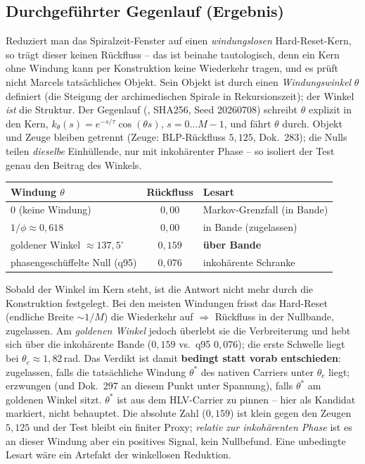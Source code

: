 \subsection*{Durchgeführter Gegenlauf (Ergebnis)}

Reduziert man das Spiralzeit-Fenster auf einen \emph{windungslosen}
Hard-Reset-Kern, so trägt dieser keinen Rückfluss -- das ist beinahe
tautologisch, denn ein Kern ohne Windung kann per Konstruktion keine
Wiederkehr tragen, und es prüft nicht Marcels tatsächliches Objekt. Sein Objekt ist durch einen \emph{Windungswinkel}
$\theta$ definiert (die Steigung der archimedischen Spirale in Rekursionszeit);
der Winkel \emph{ist} die Struktur. Der Gegenlauf
(,
SHA256, Seed 20260708) schreibt $\theta$ explizit in den Kern,
$k_\theta(s)=e^{-s/\tau}\cos(\theta s)$, $s=0\dots M{-}1$, und fährt $\theta$
durch. Objekt und Zeuge bleiben getrennt (Zeuge: BLP-Rückfluss $5{,}125$,
Dok.~283); die Nulls teilen \emph{dieselbe} Einhüllende, nur mit inkohärenter
Phase -- so isoliert der Test genau den Beitrag des Winkels.

\begin{center}\small
\begin{tabular}{lcl}
\hline
Windung $\theta$ & Rückfluss & Lesart\\
\hline
$0$ (keine Windung) & $0{,}00$ & Markov-Grenzfall (in Bande)\\
$1/\phi \approx 0{,}618$ & $0{,}00$ & in Bande (zugelassen)\\
goldener Winkel $\approx 137{,}5^\circ$ & $0{,}159$ & \textbf{über Bande}\\
phasengeschüffelte Null (q95) & $0{,}076$ & inkohärente Schranke\\
\hline
\end{tabular}
\end{center}

\noindent Sobald der Winkel im Kern steht, ist die Antwort nicht mehr durch
die Konstruktion festgelegt. Bei den meisten Windungen frisst das Hard-Reset
(endliche Breite $\sim 1/M$) die Wiederkehr auf $\Rightarrow$ Rückfluss in der
Nullbande, zugelassen. Am \emph{goldenen Winkel} jedoch überlebt sie die
Verbreiterung und hebt sich über die inkohärente Bande ($0{,}159$ vs.\ q95
$0{,}076$); die erste Schwelle liegt bei $\theta_c\approx 1{,}82$\,rad. Das
Verdikt ist damit \textbf{bedingt statt vorab entschieden}: zugelassen, falls
die tatsächliche Windung $\theta^\ast$ des nativen Carriers unter $\theta_c$
liegt; erzwungen (und Dok.~297 an diesem Punkt unter Spannung), falls
$\theta^\ast$ am goldenen Winkel sitzt. $\theta^\ast$ ist aus dem HLV-Carrier
zu pinnen -- hier als Kandidat markiert, nicht behauptet. Die absolute Zahl
($0{,}159$) ist klein gegen den Zeugen $5{,}125$ und der Test bleibt ein
finiter Proxy; \emph{relativ zur inkohärenten Phase} ist es an dieser Windung
aber ein positives Signal, kein Nullbefund. Eine unbedingte Lesart wäre ein
Artefakt der winkellosen Reduktion.


